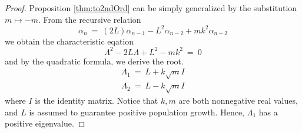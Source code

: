 \documentclass[11pt,reqno]{amsart}
\numberwithin{equation}{section}
\theoremstyle{plain}
\begin{document}
\begin{proof}
    Proposition \ref{thm:to2ndOrd} can be simply generalized by 
    the substitution \newline $m \mapsto -m$. From the recursive relation 
    \begin{equation}
        \alpha_n \ = \ (2L)\alpha_{n - 1} -L^2 \alpha_{n - 2} + mk^2 \alpha_{n - 2}
    \end{equation}
    we obtain the characteristic eqation 
    \begin{equation}
    \Lambda ^2 - 2L \Lambda + L^2 - mk^2 \ =\ 0
    \end{equation}
    and by the quadratic formula, we derive the root. 
    \begin{eqnarray}
        \Lambda_1 \ = \ L + k\sqrt{m} I 
        \nonumber \\
        \Lambda_2\ = \ L - k\sqrt{m} I
    \end{eqnarray}
    where $I$ is the identity matrix. 
    Notice that $k, m$ are both nonnegative real values, and $L$ 
    is assumed to guarantee positive population growth. Hence, 
    $\Lambda_1$ has a positive eigenvalue. 


\end{proof}
\end{document}
